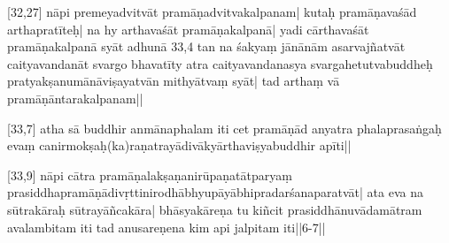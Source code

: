 [32,27] nāpi premeyadvitvāt pramāṇadvitvakalpanam| kutaḥ pramāṇavaśād arthapratīteḥ| na hy arthavaśāt pramāṇakalpanā| yadi cārthavaśāt
pramāṇakalpanā syāt adhunā 33,4       tan na śakyaṃ jānānām asarvajñatvāt caityavandanāt svargo bhavatīty atra caityavandanasya svargahetutvabuddheḥ pratyakṣanumānāviṣayatvān mithyātvaṃ syāt| tad arthaṃ vā pramāṇāntarakalpanam||

[33,7] atha sā buddhir anmānaphalam iti cet pramāṇād anyatra
phalaprasaṅgaḥ evaṃ canirmokṣaḥ(ka)raṇatrayādivākyārthaviṣyabuddhir apīti||

[33,9] nāpi cātra pramāṇalakṣaṇanirūpaṇatātparyaṃ
prasiddhapramāṇādivṛttinirodhābhyupāyābhipradarśanaparatvāt| ata eva na sūtrakāraḥ sūtrayāñcakāra| bhāsyakāreṇa tu kiñcit
prasiddhānuvādamātram avalambitam iti tad anusareṇena kim api jalpitam iti||6-7||
